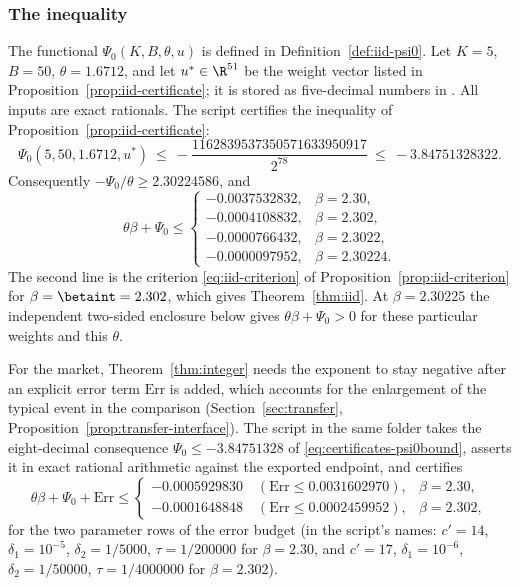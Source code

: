 \subsubsection*{The inequality}
The functional $\Psi_0(K,B,\theta,u)$ is defined in Definition~\ref{def:iid-psi0}. Let $K=5$,
$B=50$, $\theta=1.6712$, and let $u^\ast\in\R^{51}$ be the weight vector listed in
Proposition~\ref{prop:iid-certificate}; it is stored as five-decimal numbers in
. All inputs are exact rationals. The script
 certifies the inequality of
Proposition~\ref{prop:iid-certificate}:
\begin{equation}\label{eq:certificates-psi0bound}
\Psi_0(5,50,1.6712,u^\ast)\ \le\ -\frac{1162839537350571633950917}{2^{78}}\ \le\
-3.84751328322 .
\end{equation}
Consequently $-\Psi_0/\theta\ge2.30224586$, and
\begin{equation}\label{eq:certificates-exponents}
\theta\beta+\Psi_0\le
\begin{cases}
-0.0037532832,&\beta=2.30,\\
-0.0004108832,&\beta=2.302,\\
-0.0000766432,&\beta=2.3022,\\
-0.0000097952,&\beta=2.30224.
\end{cases}
\end{equation}
The second line is the criterion \eqref{eq:iid-criterion} of
Proposition~\ref{prop:iid-criterion} for $\beta=\betaint=2.302$, which gives
Theorem~\ref{thm:iid}. At $\beta=2.30225$ the independent two-sided enclosure below
gives $\theta\beta+\Psi_0>0$ for these particular weights and this $\theta$.

For the market, Theorem~\ref{thm:integer} needs the exponent to stay negative after an
explicit error term $\mathrm{Err}$ is added, which accounts for the enlargement of the
typical event in the comparison (Section~\ref{sec:transfer},
Proposition~\ref{prop:transfer-interface}).
The script  in the same folder takes the eight-decimal
consequence $\Psi_0\le-3.84751328$ of \eqref{eq:certificates-psi0bound}, asserts it in exact
rational arithmetic against the exported endpoint, and certifies
\begin{equation}\label{eq:certificates-perturbed}
\theta\beta+\Psi_0+\mathrm{Err}\le
\begin{cases}
-0.0005929830\quad(\mathrm{Err}\le0.0031602970),&\beta=2.30,\\
-0.0001648848\quad(\mathrm{Err}\le0.0002459952),&\beta=2.302,
\end{cases}
\end{equation}
for the two parameter rows of the error budget (in the script's names: $c'=14$,
$\delta_1=10^{-5}$, $\delta_2=1/5000$, $\tau=1/200000$ for $\beta=2.30$, and $c'=17$,
$\delta_1=10^{-6}$, $\delta_2=1/50000$, $\tau=1/4000000$ for $\beta=2.302$).

